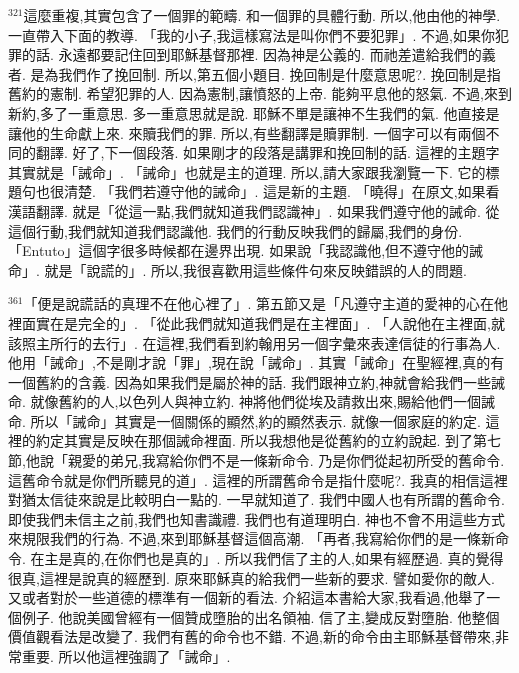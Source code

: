 \documentclass{book}
\begin{document}
$^{321}$這麼重複,其實包含了一個罪的範疇.
和一個罪的具體行動.
所以,他由他的神學.
一直帶入下面的教導.
「我的小子,我這樣寫法是叫你們不要犯罪」.
不過,如果你犯罪的話.
永遠都要記住回到耶穌基督那裡.
因為神是公義的.
而祂差遣給我們的義者.
是為我們作了挽回制.
所以,第五個小題目.
挽回制是什麼意思呢?.
挽回制是指舊約的憲制.
希望犯罪的人.
因為憲制,讓憤怒的上帝.
能夠平息他的怒氣.
不過,來到新約,多了一重意思.
多一重意思就是說.
耶穌不單是讓神不生我們的氣.
他直接是讓他的生命獻上來.
來贖我們的罪.
所以,有些翻譯是贖罪制.
一個字可以有兩個不同的翻譯.
好了,下一個段落.
如果剛才的段落是講罪和挽回制的話.
這裡的主題字其實就是「誡命」.
「誡命」也就是主的道理.
所以,請大家跟我瀏覽一下.
它的標題句也很清楚.
「我們若遵守他的誡命」.
這是新的主題.
「曉得」在原文,如果看漢語翻譯.
就是「從這一點,我們就知道我們認識神」.
如果我們遵守他的誡命.
從這個行動,我們就知道我們認識他.
我們的行動反映我們的歸屬,我們的身份.
「Entuto」這個字很多時候都在邊界出現.
如果說「我認識他,但不遵守他的誡命」.
就是「說謊的」.
所以,我很喜歡用這些條件句來反映錯誤的人的問題.

$^{361}$「便是說謊話的真理不在他心裡了」.
第五節又是「凡遵守主道的愛神的心在他裡面實在是完全的」.
「從此我們就知道我們是在主裡面」.
「人說他在主裡面,就該照主所行的去行」.
在這裡,我們看到約翰用另一個字彙來表達信徒的行事為人.
他用「誡命」,不是剛才說「罪」,現在說「誡命」.
其實「誡命」在聖經裡,真的有一個舊約的含義.
因為如果我們是屬於神的話.
我們跟神立約,神就會給我們一些誡命.
就像舊約的人,以色列人與神立約.
神將他們從埃及請救出來,賜給他們一個誡命.
所以「誡命」其實是一個關係的顯然,約的顯然表示.
就像一個家庭的約定.
這裡的約定其實是反映在那個誡命裡面.
所以我想他是從舊約的立約說起.
到了第七節,他說「親愛的弟兄,我寫給你們不是一條新命令.
乃是你們從起初所受的舊命令.
這舊命令就是你們所聽見的道」.
這裡的所謂舊命令是指什麼呢?.
我真的相信這裡對猶太信徒來說是比較明白一點的.
一早就知道了.
我們中國人也有所謂的舊命令.
即使我們未信主之前,我們也知書識禮.
我們也有道理明白.
神也不會不用這些方式來規限我們的行為.
不過,來到耶穌基督這個高潮.
「再者,我寫給你們的是一條新命令.
在主是真的,在你們也是真的」.
所以我們信了主的人,如果有經歷過.
真的覺得很真,這裡是說真的經歷到.
原來耶穌真的給我們一些新的要求.
譬如愛你的敵人.
又或者對於一些道德的標準有一個新的看法.
介紹這本書給大家,我看過,他舉了一個例子.
他說美國曾經有一個贊成墮胎的出名領袖.
信了主,變成反對墮胎.
他整個價值觀看法是改變了.
我們有舊的命令也不錯.
不過,新的命令由主耶穌基督帶來,非常重要.
所以他這裡強調了「誡命」.
\end{document}
